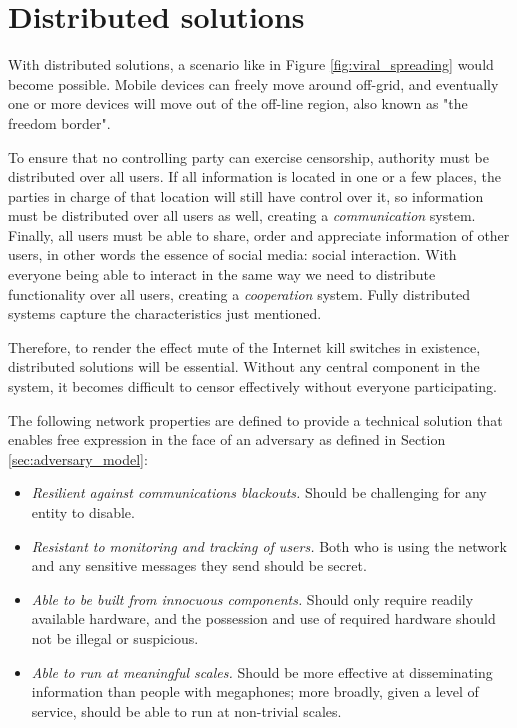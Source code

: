 \section{Distributed solutions}\label{sec:distributed_solutions}
With distributed solutions, a scenario like in Figure \ref{fig:viral_spreading} would become possible.
Mobile devices can freely move around off-grid, and eventually one or more devices will move out of the off-line region, also known as "the freedom border".

To ensure that no controlling party can exercise censorship, authority must be distributed over all users. %
If all information is located in one or a few places, the parties in charge of that location will still have control over it, so information must be distributed over all users as well, creating a \emph{communication} system.
Finally, all users must be able to share, order and appreciate information of other users, in other words the essence of social media: social interaction.
With everyone being able to interact in the same way we need to  distribute functionality over all users, creating a \emph{cooperation} system.
Fully distributed systems capture the characteristics just mentioned.

Therefore, to render the effect mute of the Internet kill switches in existence, distributed solutions will be essential.
Without any central component in the system, it becomes difficult to censor effectively without everyone participating.

The following network properties are defined \cite{hasan2013dissent} to provide a technical solution that enables free expression in the face of an adversary as defined in Section \ref{sec:adversary_model}:
\begin{itemize}
	\item \emph{Resilient against communications blackouts.}
	Should be challenging for any entity to disable.
	\item \emph{Resistant to monitoring and tracking of users.}
	Both who is using the network and any sensitive messages they send should be secret.
	\item \emph{Able to be built from innocuous components.}
	Should only require readily available hardware, and the possession and use of required hardware should not be illegal or suspicious.
	\item \emph{Able to run at meaningful scales.}
	Should be more effective at disseminating information than people with megaphones; more broadly, given a level of service, should be able to run at non-trivial scales.
\end{itemize}

